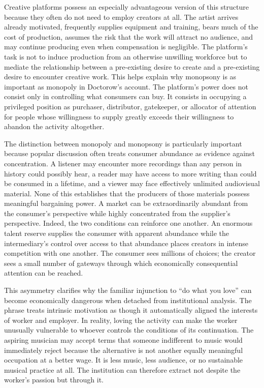 \documentclass[11pt]{article}
\begin{document}
Creative platforms possess an especially advantageous version of this structure because they often do not need to employ creators at all. The artist arrives already motivated, frequently supplies equipment and training, bears much of the cost of production, assumes the risk that the work will attract no audience, and may continue producing even when compensation is negligible. The platform's task is not to induce production from an otherwise unwilling workforce but to mediate the relationship between a pre-existing desire to create and a pre-existing desire to encounter creative work. This helps explain why monopsony is as important as monopoly in Doctorow's account. The platform's power does not consist only in controlling what consumers can buy. It consists in occupying a privileged position as purchaser, distributor, gatekeeper, or allocator of attention for people whose willingness to supply greatly exceeds their willingness to abandon the activity altogether.

The distinction between monopoly and monopsony is particularly important because popular discussion often treats consumer abundance as evidence against concentration. A listener may encounter more recordings than any person in history could possibly hear, a reader may have access to more writing than could be consumed in a lifetime, and a viewer may face effectively unlimited audiovisual material. None of this establishes that the producers of those materials possess meaningful bargaining power. A market can be extraordinarily abundant from the consumer's perspective while highly concentrated from the supplier's perspective. Indeed, the two conditions can reinforce one another. An enormous talent reserve supplies the consumer with apparent abundance while the intermediary's control over access to that abundance places creators in intense competition with one another. The consumer sees millions of choices; the creator sees a small number of gateways through which economically consequential attention can be reached.

This asymmetry clarifies why the familiar injunction to ``do what you love'' can become economically dangerous when detached from institutional analysis. The phrase treats intrinsic motivation as though it automatically aligned the interests of worker and employer. In reality, loving the activity can make the worker unusually vulnerable to whoever controls the conditions of its continuation. The aspiring musician may accept terms that someone indifferent to music would immediately reject because the alternative is not another equally meaningful occupation at a better wage. It is less music, less audience, or no sustainable musical practice at all. The institution can therefore extract not despite the worker's passion but through it.
\end{document}
